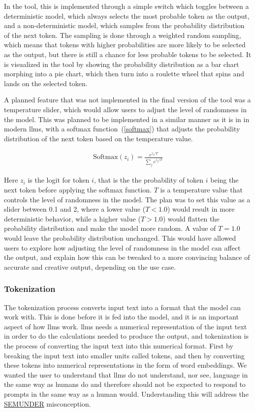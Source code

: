 In the tool, this is implemented through a simple switch which toggles between a deterministic model, which always selects the most probable token as the output, and a non-deterministic model, which samples from the probability distribution of the next token. The sampling is done through a weighted random sampling, which means that tokens with higher probabilities are more likely to be selected as the output, but there is still a chance for less probable tokens to be selected. It is visualized in the tool by showing the probability distribution as a bar chart morphing into a pie chart, which then turn into a roulette wheel that spins and lands on the selected token. 

A planned feature that was not implemented in the final version of the tool was a temperature slider, which would allow users to adjust the level of randomness in the model. This was planned to be implemented in a similar manner as it is in in modern \gls{llms}, with a softmax function~(\ref{softmax}) that adjusts the probability distribution of the next token based on the temperature value. 

\begin{align}\label{softmax}
    \text{Softmax}(z_i) = \frac{e^{z_i / T}}{\sum_{j} e^{z_j / T}}
\end{align}

Here \(z_i\) is the logit for token \(i\), that is the the probability of token \(i\) being the next token before applying the softmax function. \(T\) is a temperature value that controls the level of randomness in the model. The plan was to set this value as a slider between 0.1 and 2, where a lower value (\(T < 1.0\)) would result in more deterministic behavior, while a higher value (\(T > 1.0\)) would flatten the probability distribution and make the model more random. A value of \(T = 1.0\) would leave the probability distribution unchanged. This would have allowed users to explore how adjusting the level of randomness in the model can affect the output, and explain how this can be tweaked to a more convincing balance of accurate and creative output, depending on the use case.

\subsubsection*{Tokenization}
The tokenization process converts input text into a format that the model can work with. This is done before it is fed into the model, and it is an important aspect of how \gls{llms} work. \gls{llms} needs a numerical representation of the input text in order to do the calculations needed to produce the output, and tokenization is the process of converting the input text into this numerical format. First by breaking the input text into smaller units called tokens, and then by converting these tokens into numerical representations in the form of word embeddings. We wanted the user to understand that \gls{llms} do not understand, nor see, language in the same way as humans do and therefore should not be expected to respond to prompts in the same way as a human would. Understanding this will address the \hyperref[semunder]{SEMUNDER} misconception.

